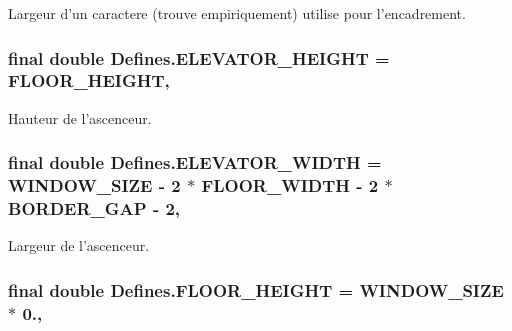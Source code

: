 Largeur d'un caractere (trouve empiriquement) utilise pour l'encadrement. 

\hypertarget{classDefines_abe0b8ba696fb8c7c3834901f0d1d654e}{
\subsubsection[{E\-L\-E\-V\-A\-T\-O\-R\-\_\-\-H\-E\-I\-G\-H\-T}]{\setlength{\rightskip}{0pt plus 5cm}final double Defines.\-E\-L\-E\-V\-A\-T\-O\-R\-\_\-\-H\-E\-I\-G\-H\-T = {\bf F\-L\-O\-O\-R\-\_\-\-H\-E\-I\-G\-H\-T}\hspace{0.3cm}{\ttfamily [static]}, {\ttfamily [package]}}}\label{classDefines_abe0b8ba696fb8c7c3834901f0d1d654e}


Hauteur de l'ascenceur. 

\hypertarget{classDefines_a6db91ad53210c6221ec3539abdd86888}{
\subsubsection[{E\-L\-E\-V\-A\-T\-O\-R\-\_\-\-W\-I\-D\-T\-H}]{\setlength{\rightskip}{0pt plus 5cm}final double Defines.\-E\-L\-E\-V\-A\-T\-O\-R\-\_\-\-W\-I\-D\-T\-H = {\bf W\-I\-N\-D\-O\-W\-\_\-\-S\-I\-Z\-E} -\/ 2 $\ast$ {\bf F\-L\-O\-O\-R\-\_\-\-W\-I\-D\-T\-H} -\/ 2 $\ast$ {\bf B\-O\-R\-D\-E\-R\-\_\-\-G\-A\-P} -\/ 2\hspace{0.3cm}{\ttfamily [static]}, {\ttfamily [package]}}}\label{classDefines_a6db91ad53210c6221ec3539abdd86888}


Largeur de l'ascenceur. 

\hypertarget{classDefines_a2a43fe315bf385b8693c70fbf824a3d0}{
\subsubsection[{F\-L\-O\-O\-R\-\_\-\-H\-E\-I\-G\-H\-T}]{\setlength{\rightskip}{0pt plus 5cm}final double Defines.\-F\-L\-O\-O\-R\-\_\-\-H\-E\-I\-G\-H\-T = {\bf W\-I\-N\-D\-O\-W\-\_\-\-S\-I\-Z\-E} $\ast$ 0.\hspace{0.3cm}{\ttfamily [static]}, {\ttfamily [package]}}}\label{classDefines_a2a43fe315bf385b8693c70fbf824a3d0}


